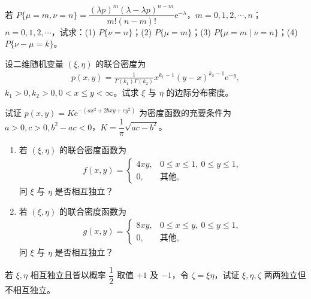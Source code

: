 \documentclass[../../main.tex]{subfiles}
\begin{document}
\begin{exercise}\label{exercise:ch03-17}
若 $P\{\mu=m,\nu=n\}=\dfrac{(\lambda p)^{m}(\lambda-\lambda p)^{n-m}}{m!(n-m)!}\mathrm{e}^{-\lambda}$，$m=0,1,2,\cdots,n$；$n=0,1,2,\cdots$，试求：(1) $P\{\nu=n\}$；(2) $P\{\mu=m\}$；(3) $P\{\mu=m\mid\nu=n\}$；(4) $P\{\nu-\mu=k\}$。
\end{exercise}

\begin{exercise}\label{exercise:ch03-18}
设二维随机变量 $(\xi,\eta)$ 的联合密度为
\begin{align*}p(x,y)=\frac{1}{\Gamma(k_1)\Gamma(k_2)}x^{k_1-1}(y-x)^{k_2-1}\mathrm{e}^{-y},\end{align*}
$k_1>0,k_2>0,0<x\leqslant y<\infty$。试求 $\xi$ 与 $\eta$ 的边际分布密度。
\end{exercise}

\begin{exercise}\label{exercise:ch03-19}
试证 $p(x,y)=K\mathrm{e}^{-(ax^{2}+2bxy+cy^{2})}$ 为密度函数的充要条件为 $a>0,c>0,b^{2}-ac<0$，$K=\dfrac{1}{\pi}\sqrt{ac-b^{2}}$。
\end{exercise}

\begin{exercise}\label{exercise:ch03-20}
\begin{enumerate}
\item 若 $(\xi,\eta)$ 的联合密度函数为
\begin{align*}f(x,y)=
\begin{cases}
4xy, & 0\leqslant x\leqslant 1,\ 0\leqslant y\leqslant 1,\\
0, & \text{其他},
\end{cases}\end{align*}
问 $\xi$ 与 $\eta$ 是否相互独立？
\item 若 $(\xi,\eta)$ 的联合密度函数为
\begin{align*}g(x,y)=
\begin{cases}
8xy, & 0\leqslant x\leqslant y,\ 0\leqslant y\leqslant 1,\\
0, & \text{其他},
\end{cases}\end{align*}
问 $\xi$ 与 $\eta$ 是否相互独立？
\end{enumerate}
\end{exercise}

\begin{exercise}\label{exercise:ch03-21}
若 $\xi,\eta$ 相互独立且皆以概率 $\dfrac{1}{2}$ 取值 $+1$ 及 $-1$，令 $\zeta=\xi\eta$，试证 $\xi,\eta,\zeta$ 两两独立但不相互独立。
\end{exercise}
\end{document}
